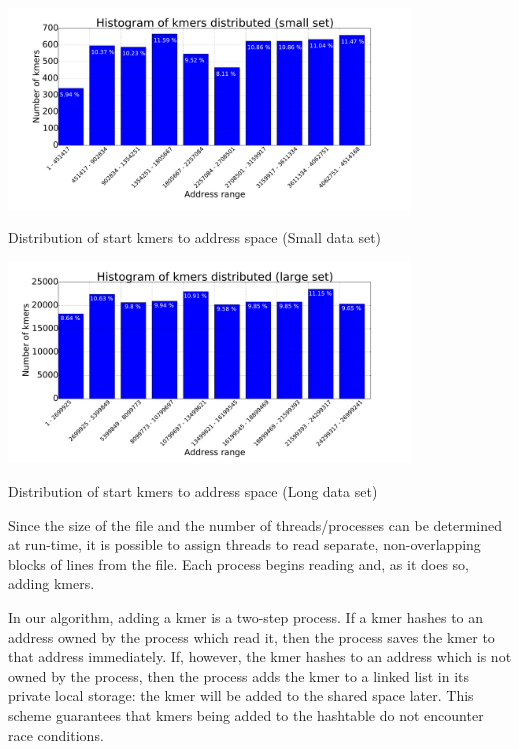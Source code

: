 \documentclass{article}
\begin{document}
\begin{minipage}{\linewidth}
  \captionsetup{type=figure}
  \begin{center}
  \includegraphics[width=0.8\textwidth]{shorthisto.pdf}
  \end{center}
  \caption{Distribution of start kmers to address space (Small data set)} \label{fig:smer_dist_small}
\end{minipage}

\begin{minipage}{\linewidth}
  \captionsetup{type=figure}
  \begin{center}
  \includegraphics[width=0.8\textwidth]{longhisto.pdf}
  \end{center}
  \caption{Distribution of start kmers to address space (Long data set)} \label{fig:smer_dist_large}
\end{minipage}

Since the size of the file and the number of threads/processes can be determined at run-time, it is possible to assign threads to read separate, non-overlapping blocks of lines from the file. Each process begins reading and, as it does so, adding kmers. 

In our algorithm, adding a kmer is a two-step process. If a kmer hashes to an address owned by the process which read it, then the process saves the kmer to that address immediately. If, however, the kmer hashes to an address which is not owned by the process, then the process adds the kmer to a linked list in its private local storage: the kmer will be added to the shared space later. This scheme guarantees that kmers being added to the hashtable do not encounter race conditions.
\end{document}
